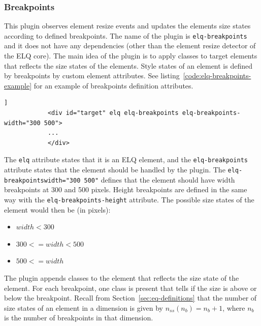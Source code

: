 \documentclass[a4paper,11pt]{kth-mag}
\newcommand{\code}[1]{\texttt{#1}}
\begin{document}
        \subsubsection{Breakpoints}\label{sec:plugin-breakpoints}
          This plugin observes element resize events and updates the \glspl{element} size states according to defined breakpoints.
          The name of the plugin is \code{elq-breakpoints} and it does not have any dependencies (other than the element resize detector of the \gls{ELQ} core).
          The main idea of the plugin is to apply classes to target \glspl{element} that reflects the size states of the \glspl{element}.
          Style states of an element is defined by breakpoints by custom element attributes.
          See listing~\ref{code:elq-breakpoints-example} for an example of breakpoints definition attributes.
          \begin{lstlisting}[gobble=12,caption={Example of an element that has two width breakpoints (300 and 500 pixels) defined by using the \code{elq-breakpoints} plugin.},captionpos=b,label={code:elq-breakpoints-example}]]
            <div id="target" elq elq-breakpoints elq-breakpoints-width="300 500">
            ...
            </div>
          \end{lstlisting}
          The \code{elq} attribute states that it is an \gls{ELQ} \gls{element}, and the \code{elq-breakpoints} attribute states that the \gls{element} should be handled by the plugin.
          The \code{elq-breakpoints\-width="300 500"} defines that the \gls{element} should have width breakpoints at 300 and 500 pixels.
          Height breakpoints are defined in the same way with the \code{elq-breakpoints-height} attribute.
          The possible size states of the \gls{element} would then be (in pixels):
          \begin{itemize}
            \item $width < 300$
            \item $300 <= width < 500$
            \item $500 <= width$
          \end{itemize}
          The plugin appends classes to the \gls{element} that reflects the size state of the \gls{element}.
          For each breakpoint, one class is present that tells if the size is above or below the breakpoint.
          Recall from Section~\ref{sec:eq-definitions} that the number of size states of an \gls{element} in a dimension is given by $n_{ss}(n_b) = n_b + 1$, where $n_b$ is the number of breakpoints in that dimension.
\end{document}
